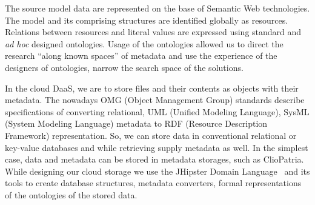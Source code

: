 \documentclass[a4paper]{jpconf}
\begin{document}
The source model data are represented on the base of Semantic Web technologies.  The model and its comprising structures are identified globally as resources.  Relations between resources and literal values are expressed using standard and \emph{ad hoc} designed ontologies.  Usage of the ontologies allowed us to direct the research ``along known spaces'' of metadata and use the experience of the designers of ontologies, narrow the search space of the solutions.


In the cloud DaaS, we are to store files and their contents as objects with their metadata.  The nowadays OMG (Object Management Group) standards describe specifications of converting relational, UML (Unified Modeling Language), SysML (System Modeling Language) metadata to RDF (Resource Description Framework) representation.  So, we can store data in conventional relational or key-value databases and while retrieving supply metadata as well.  In the simplest case, data and metadata can be stored in metadata storages, such as ClioPatria.  While designing our cloud storage we use the JHipster Domain Language~\cite{jhipster} and its tools to create database structures, metadata converters, formal representations of the ontologies of the stored data.

\end{document}
